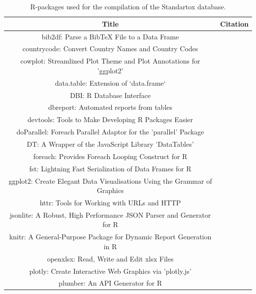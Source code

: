\documentclass[journal,datadescriptor,accept,moreauthors,pdftex]{Definitions/mdpi}
\begin{document}
\section{}

\begin{table}[H]
    \caption{R-packages used for the compilation of the Standartox database.}
    \label{tab:rpackages}
    \centering
\begin{tabular}{cc}
\toprule
\textbf{Title} & \textbf{Citation} \\ 
\midrule
bib2df: Parse a BibTeX File to a Data Frame & \citep{R-bib2df} \\
countrycode: Convert Country Names and Country Codes & \citep{R-countrycode} \\
cowplot: Streamlined Plot Theme and Plot Annotations for 'ggplot2' & \citep{R-cowplot} \\
data.table: Extension of `data.frame` & \citep{R-data.table} \\
DBI: R Database Interface & \citep{R-DBI} \\
dbreport: Automated reports from tables & \citep{R-dbreport} \\
devtools: Tools to Make Developing R Packages Easier & \citep{R-devtools} \\
doParallel: Foreach Parallel Adaptor for the 'parallel' Package & \citep{R-doParallel} \\
DT: A Wrapper of the JavaScript Library 'DataTables' & \citep{R-DT} \\
foreach: Provides Foreach Looping Construct for R & \citep{R-foreach} \\
fst: Lightning Fast Serialization of Data Frames for R & \citep{R-fst} \\
ggplot2: Create Elegant Data Visualisations Using the Grammar of Graphics & \citep{R-ggplot2} \\ httr: Tools for Working with URLs and HTTP & \citep{R-httr} \\
jsonlite: A Robust, High Performance JSON Parser and Generator for R & \citep{R-jsonlite} \\
knitr: A General-Purpose Package for Dynamic Report Generation in R & \citep{R-knitr} \\
openxlsx: Read, Write and Edit xlsx Files & \citep{R-openxlsx} \\ plotly: Create Interactive Web Graphics via 'plotly.js' & \citep{R-plotly} \\ plumber: An API Generator for R & \citep{R-plumber} \\

\end{tabular}
\end{table}
\end{document}
